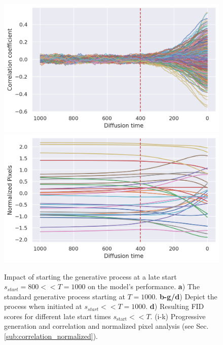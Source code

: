\begin{figure}[ht!]
\endminipage\hfill
{}
  \includegraphics[width=\linewidth]{figs/plots/cifar10_correlation_trajectories.png}
\endminipage\hfill
{}
  \includegraphics[width=\linewidth]{figs/plots/cifar10_normalized_trajectories.png}
\endminipage\hfill
\caption{Impact of starting the generative process at a late start $s_{start}=800 << T=1000$ on the model's performance. \textbf{a}) The standard generative process starting at $T=1000$. \textbf{b-g/d}) Depict the process when initiated at $s_{start}<<T=1000$. \textbf{d}) Resulting FID scores for different late start times $s_{\text{start}}<< T$. (i-k) Progressive generation and correlation and normalized pixel analysis (see Sec. \ref{sub:correlation_normalized}).}%
\label{fig:main_image_2}
\end{figure}


